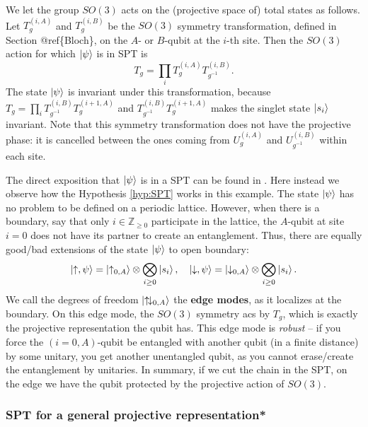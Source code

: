 \documentclass[
]{scrartcl}
\numberwithin{equation}{section}
\theoremstyle{definition}
\theoremstyle{definition}
\theoremstyle{definition}
\theoremstyle{definition}
\theoremstyle{remark}
\begin{document}
We let the group \(SO(3)\) acts on the (projective space of) total states as follows. Let \(T_g^{(i,A)}\) and \(T_g^{(i,B)}\) be the \(SO(3)\) symmetry transformation, defined in Section @ref\{Bloch\}, on the \(A\)- or \(B\)-qubit at the \(i\)-th site. Then the \(SO(3)\) action for which \(\ket{\psi}\) is in SPT is
\begin{equation}
  \label{eq:SO3SPTAction}
  T_g = \prod_{i}T_g^{(i,A)}T_{g^{-1}}^{(i,B)}.
\end{equation}
The state \(\ket{\psi}\) is invariant under this transformation, because \(T_g = \prod_i T_{g^{-1}}^{(i,B)}T_g^{(i+1,A)}\) and \(T_{g^{-1}}^{(i,B)}T_{g}^{(i+1,A)}\) makes the singlet state \(\ket{s_i}\) invariant.
Note that this symmetry transformation does not have the projective phase: it is cancelled between the ones coming from \(U_g^{(i,A)}\) and \(U_{g^{-1}}^{(i,B)}\) within each site.

The direct exposition that \(\ket{\psi}\) is in a SPT can be found in \textcite{Prakash:2018ugo}.
Here instead we observe how the Hypothesis \ref{hyp:SPT} works in this example.
The state \(\ket{\psi}\) has no problem to be defined on a periodic lattice.
However, when there is a boundary, say that only \(i \in \mathbb{Z}_{\ge 0}\) participate in the lattice, the \(A\)-qubit at site \(i=0\) does not have its partner to create an entanglement.
Thus, there are equally good/bad extensions of the state \(\ket{\psi}\) to open boundary:
\begin{equation}
  \label{eq:psiBoundary}
  \ket{\uparrow,\psi} = \ket{\uparrow_{0,A}}\otimes \bigotimes_{i\ge 0}\ket{s_{i}}, \quad
  \ket{\downarrow,\psi} = \ket{\downarrow_{0,A}}\otimes \bigotimes_{i\ge 0}\ket{s_{i}}.
\end{equation}
We call the degrees of freedom \(\ket{\uparrow \! \downarrow_{0,A}}\) the \textbf{edge modes}, as it localizes at the boundary.
On this edge mode, the \(SO(3)\) symmetry acs by \(T_g\), which is exactly the projective representation the qubit has.
This edge mode is \emph{robust} -- if you force the \((i=0,A)\)-qubit be entangled with another qubit (in a finite distance) by some unitary, you get another unentangled qubit, as you cannot erase/create the entanglement by unitaries.
In summary, if we cut the chain in the SPT, on the edge we have the qubit protected by the projective action of \(SO(3)\).

\hypertarget{spt-for-a-general-projective-representation}{%
\subsubsection{SPT for a general projective representation*}\label{spt-for-a-general-projective-representation}}
\end{document}
